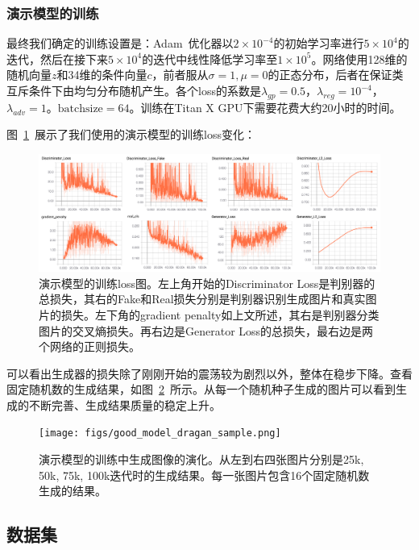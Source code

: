 \documentclass[a4paper,12pt,UTF8]{ctexart}
\newcommand{\kai}{\CJKfamily{zhkai}}	%
\begin{document}

\subsubsection{演示模型的训练}

最终我们确定的训练设置是：Adam~\cite{Kingma2014Adam}优化器以$2 \times 10^{-4}$的初始学习率进行$5 \times 10^{4}$的迭代，然后在接下来$5 \times 10^{4}$的迭代中线性降低学习率至$1 \times 10^{5}$。网络使用128维的随机向量$z$和34维的条件向量$c$，前者服从$\sigma=1, \mu=0$的正态分布，后者在保证类互斥条件下由均匀分布随机产生。各个loss的系数是$\lambda_{gp}=0.5$，$\lambda_{reg}=10^{-4}$，$\lambda_{adv}=1$。$\mathrm{batchsize}=64$。训练在Titan X GPU下需要花费大约20小时的时间。

图~\ref{fig:goodmodel_dragan}~展示了我们使用的演示模型的训练loss变化：

\begin{figure}[H]
  \centering
  \includegraphics[width=1\linewidth]{figs/good_model_dragan.png}
  \caption{\kai 演示模型的训练loss图。左上角开始的Discriminator Loss是判别器的总损失，其右的Fake和Real损失分别是判别器识别生成图片和真实图片的损失。左下角的gradient penalty如上文所述，其右是判别器分类图片的交叉熵损失。再右边是Generator Loss的总损失，最右边是两个网络的正则损失。}
  \label{fig:goodmodel_dragan}
\end{figure}

可以看出生成器的损失除了刚刚开始的震荡较为剧烈以外，整体在稳步下降。查看固定随机数的生成结果，如图~\ref{fig:dragan_evolve}~所示。从每一个随机种子生成的图片可以看到生成的不断完善、生成结果质量的稳定上升。

\begin{figure}[H]
  \centering
  \texttt{[image: figs/good\_model\_dragan\_sample.png]}
  \caption{\kai 演示模型的训练中生成图像的演化。从左到右四张图片分别是25k, 50k, 75k, 100k迭代时的生成结果。每一张图片包含16个固定随机数生成的结果。}
  \label{fig:dragan_evolve}
\end{figure}

\subsection{数据集}
\end{document}
